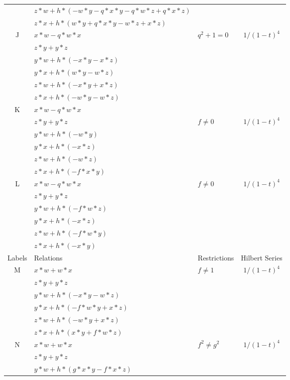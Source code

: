 \documentclass[12]{article}
\begin{document}
\begin{longtable}[c]{|c|p{5.75cm}|p{2.75cm}|c|}
   & $  z*w + h*( -w*y - q*x*y - q*w*z + q*x*z ) $ & & \\ 
   & $ z*x + h*(w*y + q*x*y - w*z + x*z ) $ & &  \\  
\hline
 J & $ x*w - q*w*x $ &\multirow{6}{*}{$ q^2 + 1 = 0 $} &\multirow{6}{*}{$ 1/(1-t)^4 $} \\ 
    & $ z*y + y*z $ & &  \\ 
   & $  y*w + h*(-x*y - x*z ) $ & & \\  
   & $ y*x + h*(w*y - w*z ) $ & & \\  
   & $ z*w + h*(-x*y + x*z ) $ & & \\ 
   & $  z*x + h*(-w*y - w*z ) $ & &  \\  
\hline
 K & $ x*w - q*w*x $ & & \\ 
    & $ z*y + y*z $ &$ f \neq 0 $ & $ 1/(1-t)^4 $ \\ 
   & $ y*w + h*(-w*y) $ & & \\  
   & $ y*x + h*(-x*z) $ & & \\  
   & $ z*w + h*(-w*z) $ & & \\ 
   & $  z*x + h*(-f*x*y) $ & &  \\  
\hline
 L & $ x*w - q*w*x $ &\multirow{6}{*}{$ f \neq 0 $} &\multirow{6}{*}{$ 1/(1-t)^4 $} \\ 
    & $ z*y + y*z $ & &  \\
   & $ y*w + h*(-f*w*z) $ & & \\  
   & $ y*x + h*(-x*z) $ & & \\  
   & $ z*w + h*(-f*w*y) $ & & \\ 
   & $ z*x + h*(-x*y) $ & &  \\  
\hline
\pagebreak
\midrule[1.0pt]
Labels & Relations & Restrictions & Hilbert Series \\
\hline
 M & $ x*w + w*x $ &\multirow{6}{*}{$ f \neq 1 $} &\multirow{6}{*}{$ 1/(1-t)^4 $} \\ 
    & $ z*y + y*z $ & &  \\ 
   & $ y*w + h*(-x*y - w*z ) $ & & \\  
   & $ y*x + h*(-f*w*y + x*z ) $ & & \\  
   & $ z*w + h*(-w*y + x*z ) $ & & \\ 
   & $ z*x + h*(x*y + f*w*z ) $ & &  \\  
\hline
 N & $ x*w + w*x $ &\multirow{6}{*}{ $ f^2 \neq g^2 $} &\multirow{6}{*}{$ 1/(1-t)^4 $} \\ 
    & $  z*y + y*z  $ & &  \\ 
   & $ y*w + h*(g*x*y - f*x*z ) $ & & \\  

\end{longtable}
\end{document}
